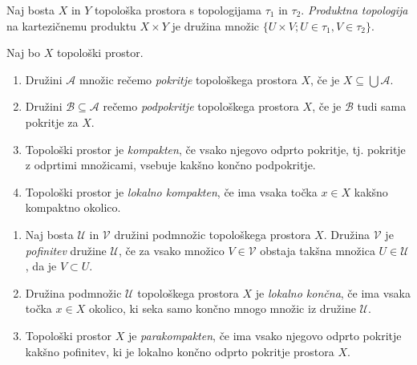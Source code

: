 \documentclass[mat1]{fmfdelo}
\begin{document}
\begin{definicija}
Naj bosta $X$ in $Y$ topološka prostora s topologijama $\tau_1$ in $\tau_2$. \emph{Produktna topologija} na kartezičnemu produktu $X \times Y$ je družina množic $\lbrace U \times V ; U \in \tau_1, V \in \tau_2 \rbrace$.
\end{definicija}

\begin{definicija}\label{def:kompakt}
Naj bo $X$ topološki prostor.
\begin{enumerate}
\item Družini $\mathcal{A}$ množic rečemo \emph{pokritje} topološkega prostora $X$, če je $X \subseteq \bigcup \mathcal{A}$.
\item Družini $\mathcal{B} \subseteq \mathcal{A}$ rečemo \emph{podpokritje} topološkega prostora $X$, če je $\mathcal{B}$ tudi sama pokritje za $X$.
\item Topološki prostor je \emph{kompakten}, če vsako njegovo odprto pokritje, tj. pokritje z odprtimi množicami, vsebuje kakšno končno podpokritje.
\item Topološki prostor je \emph{lokalno kompakten}, če ima vsaka točka $x \in X$ kakšno kompaktno okolico.
\end{enumerate}
\end{definicija}

\begin{definicija}\label{def:parakompakt}
\begin{enumerate}
\item Naj bosta $\mathcal{U}$ in $\mathcal{V}$ družini podmnožic topološkega prostora $X$. Družina $\mathcal{V}$ je \emph{pofinitev} družine $\mathcal{U}$, če za vsako množico $V \in \mathcal{V}$ obstaja takšna množica $U \in \mathcal{U}$, da je $V \subset U$.
\item Družina podmnožic $\mathcal{U}$ topološkega prostora $X$ je \emph{lokalno končna}, če ima vsaka točka $x \in X$ okolico, ki seka samo končno mnogo množic iz družine $\mathcal{U}$.
\item Topološki prostor $X$ je \emph{parakompakten}, če ima vsako njegovo odprto pokritje kakšno pofinitev, ki je lokalno končno odprto pokritje prostora $X$.
\end{enumerate}
\end{definicija}
\end{document}
